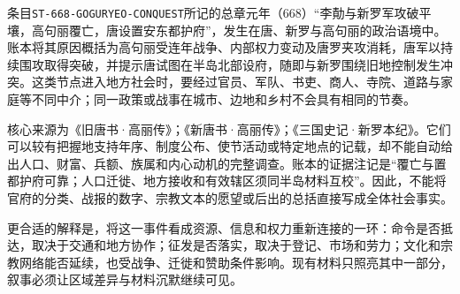 条目\texttt{ST-668-GOGURYEO-CONQUEST}所记的总章元年（668）“李勣与新罗军攻破平壤，高句丽覆亡，唐设置安东都护府”，发生在唐、新罗与高句丽的政治语境中。账本将其原因概括为高句丽受连年战争、内部权力变动及唐罗夹攻消耗，唐军以持续围攻取得突破，并提示唐试图在半岛北部设府，随即与新罗围绕旧地控制发生冲突。这类节点进入地方社会时，要经过官员、军队、书吏、商人、寺院、道路与家庭等不同中介；同一政策或战事在城市、边地和乡村不会具有相同的节奏。

核心来源为《旧唐书·高丽传》；《新唐书·高丽传》；《三国史记·新罗本纪》。它们可以较有把握地支持年序、制度公布、使节活动或特定地点的记载，却不能自动给出人口、财富、兵额、族属和内心动机的完整调查。账本的证据注记是“覆亡与置都护府可靠；人口迁徙、地方接收和有效辖区须同半岛材料互校”。因此，不能将官府的分类、战报的数字、宗教文本的愿望或后出的总括直接写成全体社会事实。

更合适的解释是，将这一事件看成资源、信息和权力重新连接的一环：命令是否抵达，取决于交通和地方协作；征发是否落实，取决于登记、市场和劳力；文化和宗教网络能否延续，也受战争、迁徙和赞助条件影响。现有材料只照亮其中一部分，叙事必须让区域差异与材料沉默继续可见。
